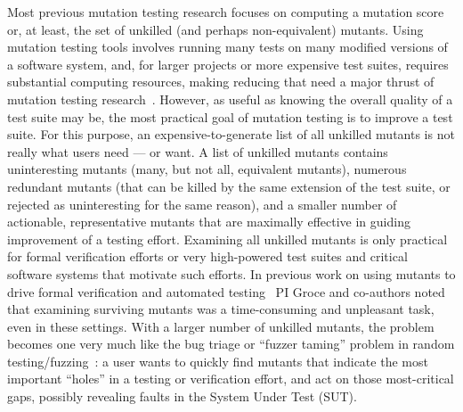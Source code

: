 Most previous mutation testing research focuses on computing a mutation score or, at least, the set of unkilled (and perhaps non-equivalent) mutants.  Using mutation testing tools involves running many tests on many modified versions of a software system, and, for larger projects or more expensive test suites, requires substantial computing resources, making reducing that need a major thrust of mutation testing research~\cite{jia2011analysis}.  However, as useful as knowing the overall quality of a test suite may be, the most practical goal of mutation testing is to improve a test suite.  For this purpose, an expensive-to-generate list of all unkilled mutants is not really what users need --- or want.  A list of unkilled mutants contains uninteresting mutants (many, but not all, equivalent mutants), numerous redundant mutants (that can be killed by the same extension of the test suite, or rejected as uninteresting for the same reason), and a smaller number of actionable, representative mutants that are maximally effective in guiding improvement of a testing effort.  Examining all unkilled mutants is only practical for formal verification efforts or very high-powered test suites and critical software systems that motivate such efforts.  In previous work on using mutants to drive formal verification and automated testing~\cite{groce2015verified,groce2018verified,mutKernel} PI Groce and co-authors noted that examining surviving mutants was a time-consuming and unpleasant task, even in these settings.  With a larger number of unkilled mutants, the problem becomes one very much like the bug triage or ``fuzzer taming'' problem in random testing/fuzzing~\cite{PLDI13,SemCrash}:  a user wants to quickly find mutants that indicate the most important ``holes'' in a testing or verification effort, and act on those most-critical gaps, possibly revealing faults in the System Under Test (SUT).

